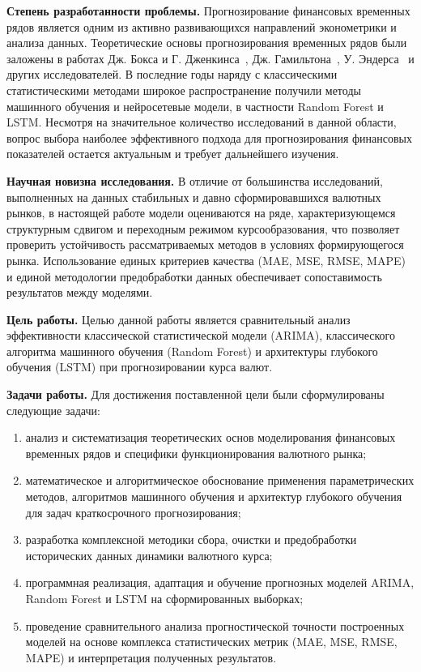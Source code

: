 \textbf{Степень разработанности проблемы.}
Прогнозирование финансовых временных рядов является одним из активно развивающихся направлений эконометрики и анализа данных. Теоретические основы прогнозирования временных рядов были заложены в работах Дж. Бокса 
и Г. Дженкинса~\cite{box2016}, Дж. Гамильтона~\cite{hamilton1994}, У. Эндерса~\cite{enders2015} 
и других исследователей. В последние годы наряду с классическими статистическими методами широкое распространение получили методы машинного обучения и нейросетевые модели, в частности Random Forest и LSTM. Несмотря на значительное количество исследований в данной области, вопрос выбора наиболее эффективного подхода для прогнозирования финансовых показателей остается актуальным и требует дальнейшего изучения.

\textbf{Научная новизна исследования.} В отличие от большинства 
исследований, выполненных на данных стабильных и давно сформировавшихся валютных рынков, 
в настоящей работе модели оцениваются на ряде, характеризующемся структурным сдвигом 
и переходным режимом курсообразования, что позволяет проверить устойчивость рассматриваемых 
методов в условиях формирующегося рынка. Использование единых критериев качества (MAE, MSE, RMSE, 
MAPE) и единой методологии предобработки данных обеспечивает сопоставимость результатов 
между моделями.

\textbf{Цель работы.}
Целью данной работы является сравнительный анализ эффективности классической статистической 
модели (ARIMA), классического алгоритма машинного обучения (Random Forest) и архитектуры 
глубокого обучения (LSTM) при прогнозировании курса валют.

\textbf{Задачи работы.} Для достижения поставленной цели были сформулированы следующие задачи:
\begin{enumerate}
    \item анализ и систематизация теоретических основ моделирования финансовых временных рядов и специфики функционирования валютного рынка;
    \item математическое и алгоритмическое обоснование применения параметрических методов, алгоритмов машинного обучения и архитектур глубокого обучения для задач краткосрочного прогнозирования;
    \item разработка комплексной методики сбора, очистки и предобработки исторических данных динамики валютного курса;
    \item программная реализация, адаптация и обучение прогнозных моделей ARIMA, Random Forest и LSTM на сформированных выборках;
    \item проведение сравнительного анализа прогностической точности построенных моделей на основе комплекса статистических метрик (MAE, MSE, RMSE, MAPE) и интерпретация полученных результатов.
\end{enumerate}

